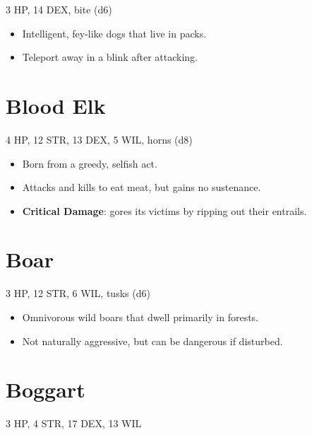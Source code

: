 \documentclass[
  10pt,
  american,
]{article}
\begin{document}
3 HP, 14 DEX, bite (d6)

\begin{samepage}
\begin{itemize}
\setlength\itemsep{-.5em}
\item Intelligent, fey-like dogs that live in packs.
\item Teleport away in a blink after attacking.
\end{itemize}
\end{samepage}

\hypertarget{blood-elk}{%
\section{Blood Elk}\label{blood-elk}}

4 HP, 12 STR, 13 DEX, 5 WIL, horns (d8)

\begin{samepage}
\begin{itemize}
\setlength\itemsep{-.5em}
\item Born from a greedy, selfish act.
\item Attacks and kills to eat meat, but gains no sustenance.
\item \textbf{Critical Damage}: gores its victims by ripping out their entrails.
\end{itemize}
\end{samepage}

\hypertarget{boar}{%
\section{Boar}\label{boar}}

3 HP, 12 STR, 6 WIL, tusks (d6)

\begin{samepage}
\begin{itemize}
\setlength\itemsep{-.5em}
\item Omnivorous wild boars that dwell primarily in forests.
\item Not naturally aggressive, but can be dangerous if disturbed.
\end{itemize}
\end{samepage}

\hypertarget{boggart}{%
\section{Boggart}\label{boggart}}

3 HP, 4 STR, 17 DEX, 13 WIL
\end{document}
